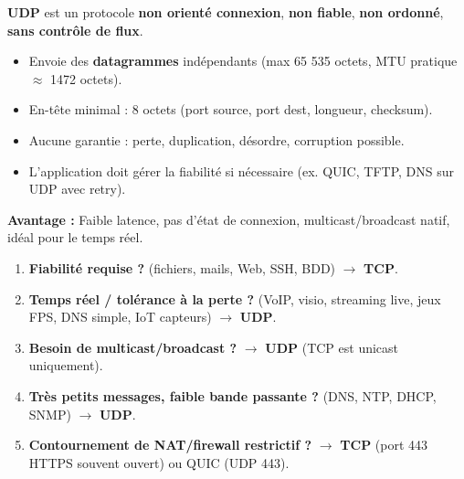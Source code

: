 \documentclass[11pt]{article}
\begin{document}
\begin{propriete}
\textbf{UDP} est un protocole \textbf{non orienté connexion}, \textbf{non fiable}, \textbf{non ordonné}, \textbf{sans contrôle de flux}.
\begin{itemize}
    \item Envoie des \textbf{datagrammes} indépendants (max 65 535 octets, MTU pratique $\approx$ 1472 octets).
    \item En-tête minimal : 8 octets (port source, port dest, longueur, checksum).
    \item Aucune garantie : perte, duplication, désordre, corruption possible.
    \item L'application doit gérer la fiabilité si nécessaire (ex. QUIC, TFTP, DNS sur UDP avec retry).
\end{itemize}
\textbf{Avantage :} Faible latence, pas d'état de connexion, multicast/broadcast natif, idéal pour le temps réel.
\end{propriete}

\begin{methode}
\begin{enumerate}
    \item \textbf{Fiabilité requise ?} (fichiers, mails, Web, SSH, BDD) $\to$ \textbf{TCP}.
    \item \textbf{Temps réel / tolérance à la perte ?} (VoIP, visio, streaming live, jeux FPS, DNS simple, IoT capteurs) $\to$ \textbf{UDP}.
    \item \textbf{Besoin de multicast/broadcast ?} $\to$ \textbf{UDP} (TCP est unicast uniquement).
    \item \textbf{Très petits messages, faible bande passante ?} (DNS, NTP, DHCP, SNMP) $\to$ \textbf{UDP}.
    \item \textbf{Contournement de NAT/firewall restrictif ?} $\to$ \textbf{TCP} (port 443 HTTPS souvent ouvert) ou QUIC (UDP 443).
\end{enumerate}
\end{methode}
\end{document}
